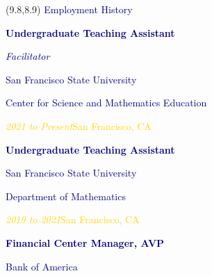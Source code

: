 \documentclass[hidelinks, 10pt]{article}
\begin{document}
\begin{textblock}{4}(9.8,8.9)
	\setlength{\parindent}{0cm}
    \large{\textcolor{navy}{Employment History}}

	\vspace{4mm}

	\footnotesize\textcolor{navy}{\scriptsize\textbf{Undergraduate Teaching Assistant}}

	\vspace{0.5mm}

	\scriptsize\textcolor{navy}{\scriptsize\emph{Facilitator}}
	
	\vspace{0.5mm}

	\footnotesize\textcolor{navy}{\scriptsize San Francisco State University}

	\vspace{0.5mm}

	\scriptsize\textcolor{navy}{\scriptsize Center for Science and Mathematics Education}

	\vspace{0.5mm}

	\scriptsize\textcolor{gold}{\scriptsize\emph{2021 to Present}\hfill San
	Francisco, CA}

	\vspace{4mm}

	\footnotesize\textcolor{navy}{\scriptsize\textbf{Undergraduate Teaching Assistant}}

	\vspace{0.5mm}

	\footnotesize\textcolor{navy}{\scriptsize San Francisco State University}

	\vspace{0.5mm}

	\scriptsize\textcolor{navy}{\scriptsize Department of Mathematics}

	\vspace{0.5mm}

	\scriptsize\textcolor{gold}{\scriptsize\emph{2019 to 2021}\hfill San
	Francisco, CA}

	\vspace{4mm}

	\footnotesize\textcolor{navy}{\scriptsize\textbf{Financial Center Manager, AVP}}

	\vspace{0.5mm}

	\footnotesize\textcolor{navy}{\scriptsize Bank of America}

	\vspace{0.5mm}


\end{textblock}
\end{document}
